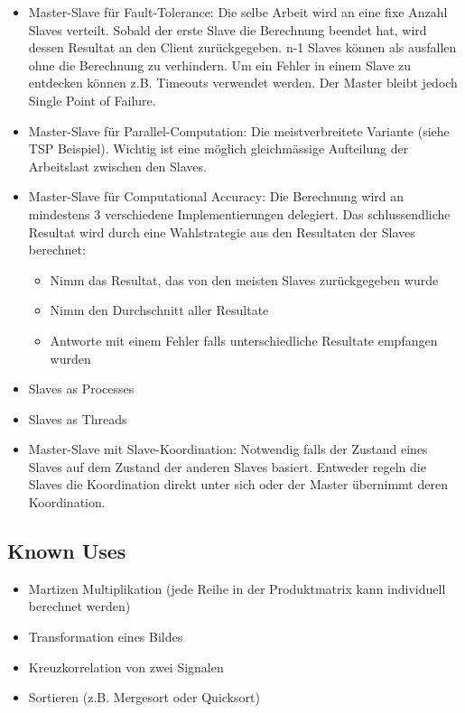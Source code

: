 \begin{itemize}
	\item Master-Slave für Fault-Tolerance: Die selbe Arbeit wird an eine fixe Anzahl Slaves verteilt. Sobald der erste Slave die Berechnung beendet hat, wird dessen Resultat an den Client zurückgegeben. n-1 Slaves können als ausfallen ohne die Berechnung zu verhindern. Um ein Fehler in einem Slave zu entdecken können z.B. Timeouts verwendet werden. Der Master bleibt jedoch Single Point of Failure.
	\item Master-Slave für Parallel-Computation: Die meistverbreitete Variante (siehe TSP Beispiel). Wichtig ist eine möglich gleichmässige Aufteilung der Arbeitslast zwischen den Slaves.
	\item Master-Slave für Computational Accuracy: Die Berechnung wird an mindestens 3 verschiedene Implementierungen delegiert. Das schlussendliche Resultat wird durch eine Wahlstrategie aus den Resultaten der Slaves berechnet:
	\begin{itemize}
		\item Nimm das Resultat, das von den meisten Slaves zurückgegeben wurde
		\item Nimm den Durchschnitt aller Resultate
		\item Antworte mit einem Fehler falls unterschiedliche Resultate empfangen wurden
	\end{itemize}
	\item Slaves as Processes
	\item Slaves as Threads
	\item Master-Slave mit Slave-Koordination: Notwendig falls der Zustand eines Slaves auf dem Zustand der anderen Slaves basiert. Entweder regeln die Slaves die Koordination direkt unter sich oder der Master übernimmt deren Koordination.
\end{itemize}

\subsection*{Known Uses}

\begin{itemize}
	\item Martizen Multiplikation (jede Reihe in der Produktmatrix kann individuell berechnet werden)
	\item Transformation eines Bildes
	\item Kreuzkorrelation von zwei Signalen
	\item Sortieren (z.B. Mergesort oder Quicksort)
\end{itemize}

